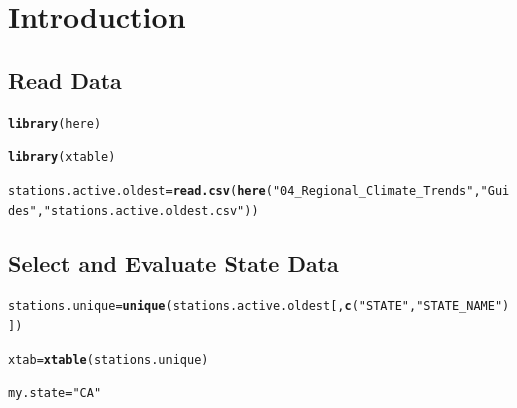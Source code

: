 \documentclass{article}\usepackage[]{graphicx}\usepackage[]{xcolor}
\makeatletter
\newcommand{\hlstr}[1]{\textcolor[rgb]{0.192,0.494,0.8}{#1}}%
\newcommand{\hlstd}[1]{\textcolor[rgb]{0.345,0.345,0.345}{#1}}%
\newcommand{\hlkwb}[1]{\textcolor[rgb]{0.69,0.353,0.396}{#1}}%
\newcommand{\hlkwd}[1]{\textcolor[rgb]{0.737,0.353,0.396}{\textbf{#1}}}%
\newenvironment{kframe}{%
 \def\at@end@of@kframe{}%
 \ifinner\ifhmode%
  \def\at@end@of@kframe{\end{minipage}}%
  \begin{minipage}{\columnwidth}%
 \fi\fi%
 \def\FrameCommand##1{\hskip\@totalleftmargin \hskip-\fboxsep
 \colorbox{shadecolor}{##1}\hskip-\fboxsep
     \hskip-\linewidth \hskip-\@totalleftmargin \hskip\columnwidth}%
 \MakeFramed {\advance\hsize-\width
   \@totalleftmargin\z@ \linewidth\hsize
   \@setminipage}}%
 {\par\unskip\endMakeFramed%
 \at@end@of@kframe}
\newenvironment{knitrout}{}{} %
\makeatother
\begin{document}
\section{Introduction}

\subsection{Read Data}

\begin{knitrout}
\color{fgcolor}\begin{kframe}
\begin{alltt}
\hlkwd{library}\hlstd{(here)}
\end{alltt}


{\ttfamily\noindent\itshape\color{messagecolor}{\#\# here() starts at /home/mwl04747/RTricks}}\begin{alltt}
\hlkwd{library}\hlstd{(xtable)}

\hlstd{stations.active.oldest} \hlkwb{=} \hlkwd{read.csv}\hlstd{(}\hlkwd{here}\hlstd{(}\hlstr{"04_Regional_Climate_Trends"}\hlstd{,} \hlstr{"Guides"}\hlstd{,} \hlstr{"stations.active.oldest.csv"}\hlstd{))}
\end{alltt}
\end{kframe}
\end{knitrout}

\subsection{Select and Evaluate State Data}

\begin{knitrout}
\color{fgcolor}\begin{kframe}
\begin{alltt}
\hlstd{stations.unique} \hlkwb{=} \hlkwd{unique}\hlstd{(stations.active.oldest[,}\hlkwd{c}\hlstd{(}\hlstr{"STATE"}\hlstd{,} \hlstr{"STATE_NAME"}\hlstd{)])}

\hlstd{xtab} \hlkwb{=} \hlkwd{xtable}\hlstd{(stations.unique)}
\end{alltt}
\end{kframe}
\end{knitrout}


\begin{knitrout}
\color{fgcolor}\begin{kframe}
\begin{alltt}
\hlstd{my.state} \hlkwb{=} \hlstr{"CA"}
\end{alltt}
\end{kframe}
\end{knitrout}
\end{document}
